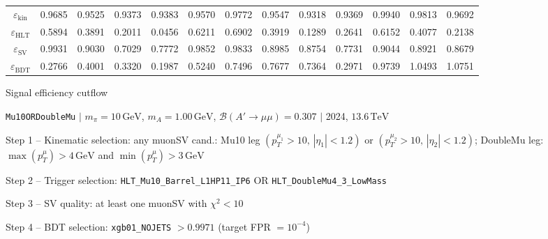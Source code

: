 \documentclass[10pt,a4paper]{article}
\begin{document}
\begin{landscape}
{\begin{tabular}{c|cccc|cccc|cccc}
\midrule
$\varepsilon_{\mathrm{kin}}$ & 0.9685 & 0.9525 & 0.9373 & 0.9383 & 0.9570 & 0.9772 & 0.9547 & 0.9318 & 0.9369 & 0.9940 & 0.9813 & 0.9692\\
$\varepsilon_{\mathrm{HLT}}$ & 0.5894 & 0.3891 & 0.2011 & 0.0456 & 0.6211 & 0.6902 & 0.3919 & 0.1289 & 0.2641 & 0.6152 & 0.4077 & 0.2138\\
$\varepsilon_{\mathrm{SV}}$ & 0.9931 & 0.9030 & 0.7029 & 0.7772 & 0.9852 & 0.9833 & 0.8985 & 0.8754 & 0.7731 & 0.9044 & 0.8921 & 0.8679\\
$\varepsilon_{\mathrm{BDT}}$ & 0.2766 & 0.4001 & 0.3320 & 0.1987 & 0.5240 & 0.7496 & 0.7677 & 0.7364 & 0.2971 & 0.9739 & 1.0493 & 1.0751\\
\bottomrule
\end{tabular}}

\end{landscape}
\clearpage

{\large Signal efficiency cutflow

 \texttt{Mu10ORDoubleMu} $|$ $m_{\pi}=10\,\mathrm{GeV}$, $m_{A}=1.00\,\mathrm{GeV}$, $\mathcal{B}(A'\!\to\!\mu\mu)=0.307$ $|$ 2024, $13.6\,\mathrm{TeV}$}

\vspace{0.8em}

Step 1 -- Kinematic selection: any muonSV cand.: Mu10 leg $(p_T^{\mu_1}{>}10,\,|\eta_1|{<}1.2)$ or $(p_T^{\mu_2}{>}10,\,|\eta_2|{<}1.2)$; DoubleMu leg: $\max(p_T^{\mu}){>}4\,\mathrm{GeV}$ and $\min(p_T^{\mu}){>}3\,\mathrm{GeV}$

Step 2 -- Trigger selection: \texttt{HLT\_Mu10\_Barrel\_L1HP11\_IP6} OR \texttt{HLT\_DoubleMu4\_3\_LowMass}

Step 3 -- SV quality: at least one muonSV with $\chi^2<10$

Step 4 -- BDT selection: \texttt{xgb01\_NOJETS} $>0.9971$ (target FPR $=10^{-4}$)

\vspace{0.8em}
\end{document}
